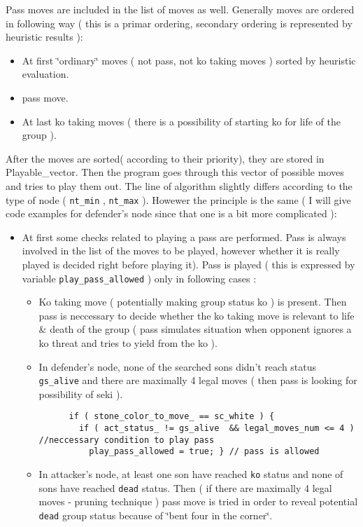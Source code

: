 Pass moves are included in the list of moves as well. Generally moves are ordered in following way ( this is a primar ordering, secondary ordering is represented by heuristic results ):\begin{itemize}
\item At first \char`\"{}ordinary\char`\"{} moves ( not pass, not ko taking moves ) sorted by heuristic evaluation.\item pass move.\item At last ko taking moves ( there is a possibility of starting ko for life of the group ).\end{itemize}


After the moves are sorted( according to their priority), they are stored in Playable\_\-vector. Then the program goes through this vector of possible moves and tries to play them out. The line of algorithm slightly differs according to the type of node ( {\tt nt\_\-min} , {\tt nt\_\-max} ). Howewer the principle is the same ( I will give code examples for defender's node since that one is a bit more complicated ):\begin{itemize}
\item At first some checks related to playing a pass are performed. Pass is always involved in the list of the moves to be played, however whether it is really played is decided right before playing it). Pass is played ( this is expressed by variable {\tt play\_\-pass\_\-allowed} ) only in following cases :\begin{itemize}
\item Ko taking move ( potentially making group status ko ) is present. Then pass is neccessary to decide whether the ko taking move is relevant to life \& death of the group ( pass simulates situation when opponent ignores a ko threat and tries to yield from the ko ).\item In defender's node, none of the searched sons didn't reach status {\tt gs\_\-alive} and there are maximally 4 legal moves ( then pass is looking for possibility of seki ). 

\footnotesize\begin{verbatim}      if ( stone_color_to_move_ == sc_white ) { 
        if ( act_status_ != gs_alive  && legal_moves_num <= 4 ) //neccessary condition to play pass
          play_pass_allowed = true; } // pass is allowed
\end{verbatim}
\normalsize
\item In attacker's node, at least one son have reached {\tt ko} status and none of sons have reached {\tt dead} status. Then ( if there are maximally 4 legal moves - pruning technique ) pass move is tried in order to reveal potential {\tt dead} group status because of \char`\"{}bent four in the corner\char`\"{}.\end{itemize}
\end{itemize}


